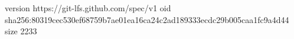 version https://git-lfs.github.com/spec/v1
oid sha256:80319cec530ef68759b7ae01ea16ca24c2ad189333ecdc29b005caa1fc9a4d44
size 2233
